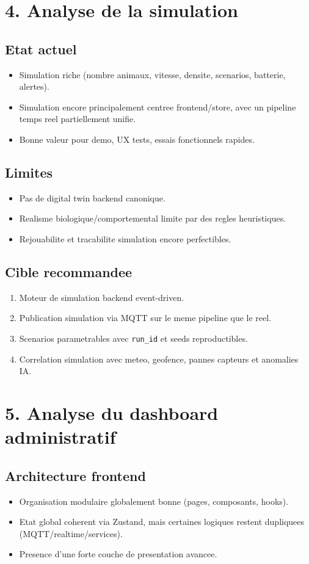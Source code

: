 \documentclass[12pt,a4paper]{article}
\begin{document}
\section{4. Analyse de la simulation}
\subsection{Etat actuel}
\begin{itemize}
  \item Simulation riche (nombre animaux, vitesse, densite, scenarios, batterie, alertes).
  \item Simulation encore principalement centree frontend/store, avec un pipeline temps reel partiellement unifie.
  \item Bonne valeur pour demo, UX tests, essais fonctionnels rapides.
\end{itemize}

\subsection{Limites}
\begin{itemize}
  \item Pas de digital twin backend canonique.
  \item Realisme biologique/comportemental limite par des regles heuristiques.
  \item Rejouabilite et tracabilite simulation encore perfectibles.
\end{itemize}

\subsection{Cible recommandee}
\begin{enumerate}
  \item Moteur de simulation backend event-driven.
  \item Publication simulation via MQTT sur le meme pipeline que le reel.
  \item Scenarios parametrables avec \texttt{run\_id} et seeds reproductibles.
  \item Correlation simulation avec meteo, geofence, pannes capteurs et anomalies IA.
\end{enumerate}

\section{5. Analyse du dashboard administratif}
\subsection{Architecture frontend}
\begin{itemize}
  \item Organisation modulaire globalement bonne (pages, composants, hooks).
  \item Etat global coherent via Zustand, mais certaines logiques restent dupliquees (MQTT/realtime/services).
  \item Presence d'une forte couche de presentation avancee.
\end{itemize}
\end{document}
